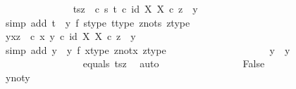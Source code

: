 \begin{isabellebody}
\ \ \ \ \ \ \ \ \ \ \ \ \ \isamarkupfalse%
\ t{\isacharunderscore}{\kern0pt}sz{\isacharcolon}{\kern0pt}\ {\isachardoublequoteopen}{\isacharparenleft}{\kern0pt}{\isasymTheta}\ {\isasymcirc}\isactrlsub c\ {\isasymlangle}s{\isacharcomma}{\kern0pt}\ t{\isasymrangle}{\isacharparenright}{\kern0pt}\isactrlsup {\isasymflat}\ {\isasymcirc}\isactrlsub c\ {\isasymlangle}id\ X{\isacharcomma}{\kern0pt}\ {\isasymbeta}\isactrlbsub X\isactrlesub {\isasymrangle}\ {\isasymcirc}\isactrlsub c\ z\ {\isacharequal}{\kern0pt}\ y{}{\isachardoublequoteclose}\isanewline
\ \ \ \ \ \ \ \ \ \ \ \ \ \ \ \isamarkupfalse%
\ {\isacharparenleft}{\kern0pt}simp\ add{\isacharcolon}{\kern0pt}\ {\isacartoucheopen}t\ {\isasymnoteq}\ y{}{\isacartoucheclose}\ f{}\ s{\isacharunderscore}{\kern0pt}type\ t{\isacharunderscore}{\kern0pt}type\ z{\isacharunderscore}{\kern0pt}not{\isacharunderscore}{\kern0pt}s\ z{\isacharunderscore}{\kern0pt}type{\isacharparenright}{\kern0pt}\isanewline
\ \ \ \ \ \ \ \ \ \ \ \ \ \isamarkupfalse%
\ y{\isacharunderscore}{\kern0pt}xz{\isacharcolon}{\kern0pt}\ {\isachardoublequoteopen}{\isacharparenleft}{\kern0pt}{\isasymTheta}\ {\isasymcirc}\isactrlsub c\ {\isasymlangle}x{\isacharcomma}{\kern0pt}\ y{\isasymrangle}{\isacharparenright}{\kern0pt}\isactrlsup {\isasymflat}\ {\isasymcirc}\isactrlsub c\ {\isasymlangle}id\ X{\isacharcomma}{\kern0pt}\ {\isasymbeta}\isactrlbsub X\isactrlesub {\isasymrangle}\ {\isasymcirc}\isactrlsub c\ z\ {\isacharequal}{\kern0pt}\ y{}{\isachardoublequoteclose}\isanewline
\ \ \ \ \ \ \ \ \ \ \ \ \ \ \ \isamarkupfalse%
\ {\isacharparenleft}{\kern0pt}simp\ add{\isacharcolon}{\kern0pt}\ {\isacartoucheopen}y\ {\isacharequal}{\kern0pt}\ y{}{\isacartoucheclose}\ f{}\ x{\isacharunderscore}{\kern0pt}type\ z{\isacharunderscore}{\kern0pt}not{\isacharunderscore}{\kern0pt}x\ z{\isacharunderscore}{\kern0pt}type{\isacharparenright}{\kern0pt}\ \ \ \ \isanewline
\ \ \ \ \ \ \ \ \ \ \ \ \ \isamarkupfalse%
\ \isamarkupfalse%
\ {\isachardoublequoteopen}y{}\ {\isacharequal}{\kern0pt}\ y{}{\isachardoublequoteclose}\isanewline
\ \ \ \ \ \ \ \ \ \ \ \ \ \ \ \isamarkupfalse%
\ equals{}\ t{\isacharunderscore}{\kern0pt}sz\ \isamarkupfalse%
\ auto\isanewline
\ \ \ \ \ \ \ \ \ \ \ \ \ \isamarkupfalse%
\ \isamarkupfalse%
\ False\isanewline
\ \ \ \ \ \ \ \ \ \ \ \ \ \ \ \isamarkupfalse%
\ y{}{\isacharunderscore}{\kern0pt}not{\isacharunderscore}{\kern0pt}y{}\ \isamarkupfalse%

\end{isabellebody}
